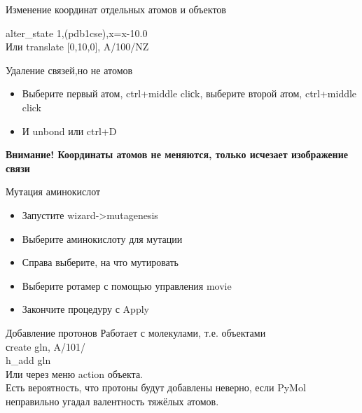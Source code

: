 		\begin{frame}{Изменение координат отдельных  атомов и объектов}

			\textcolor{blue!40!white}{alter\_state 1,(pdb1cse),x=x-10.0}\\
			Или 
			\textcolor{blue!40!white}{translate [0,10,0], A/100/NZ}

		\end{frame}

		\begin{frame}{Удаление связей,но не атомов}
			\begin{itemize}
				\item Выберите первый атом, ctrl+middle cliсk, выберите второй атом, ctrl+middle click

				\item И unbond или ctrl+D
			\end{itemize}

				\textbf{ Внимание! Координаты атомов не меняются, только исчезает изображение связи}
			
		\end{frame}

	\begin{frame}{Мутация аминокислот}
			\begin{itemize}
				\item Запустите wizard->mutagenesis 
				\item Выберите аминокислоту для мутации
				\item Справа выберите, на что мутировать
				\item Выберите ротамер с помощью управления movie
				\item Закончите процедуру с Apply
			\end{itemize}
	\end{frame}

     \begin{frame}{Добавление протонов}
			Работает с молекулами, т.е. объектами\\

			\textcolor{blue!40!white}{сreate gln, A/101/}\\
			\textcolor{blue!40!white}{h\_add gln}\\
			Или через меню action объекта.\\
			
			Есть вероятность, что протоны будут добавлены неверно, 
            если PyMol неправильно угадал валентность тяжёлых атомов.

	\end{frame}

